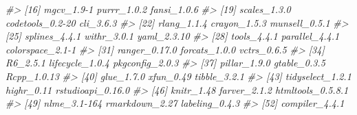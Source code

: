 \documentclass[
]{article}
\newenvironment{Shaded}{\begin{snugshade}}{\end{snugshade}}
\newcommand{\CommentTok}[1]{\textcolor[rgb]{0.56,0.35,0.01}{\textit{#1}}}
\begin{document}
\begin{Shaded}
\begin{Highlighting}[]
\CommentTok{\#\textgreater{} [16] mgcv\_1.9{-}1        purrr\_1.0.2       fansi\_1.0.6      }
\CommentTok{\#\textgreater{} [19] scales\_1.3.0      codetools\_0.2{-}20  cli\_3.6.3        }
\CommentTok{\#\textgreater{} [22] rlang\_1.1.4       crayon\_1.5.3      munsell\_0.5.1    }
\CommentTok{\#\textgreater{} [25] splines\_4.4.1     withr\_3.0.1       yaml\_2.3.10      }
\CommentTok{\#\textgreater{} [28] tools\_4.4.1       parallel\_4.4.1    colorspace\_2.1{-}1 }
\CommentTok{\#\textgreater{} [31] ranger\_0.17.0     forcats\_1.0.0     vctrs\_0.6.5      }
\CommentTok{\#\textgreater{} [34] R6\_2.5.1          lifecycle\_1.0.4   pkgconfig\_2.0.3  }
\CommentTok{\#\textgreater{} [37] pillar\_1.9.0      gtable\_0.3.5      Rcpp\_1.0.13      }
\CommentTok{\#\textgreater{} [40] glue\_1.7.0        xfun\_0.49         tibble\_3.2.1     }
\CommentTok{\#\textgreater{} [43] tidyselect\_1.2.1  highr\_0.11        rstudioapi\_0.16.0}
\CommentTok{\#\textgreater{} [46] knitr\_1.48        farver\_2.1.2      htmltools\_0.5.8.1}
\CommentTok{\#\textgreater{} [49] nlme\_3.1{-}164      rmarkdown\_2.27    labeling\_0.4.3   }
\CommentTok{\#\textgreater{} [52] compiler\_4.4.1}
\end{Highlighting}
\end{Shaded}


  
\end{document}
